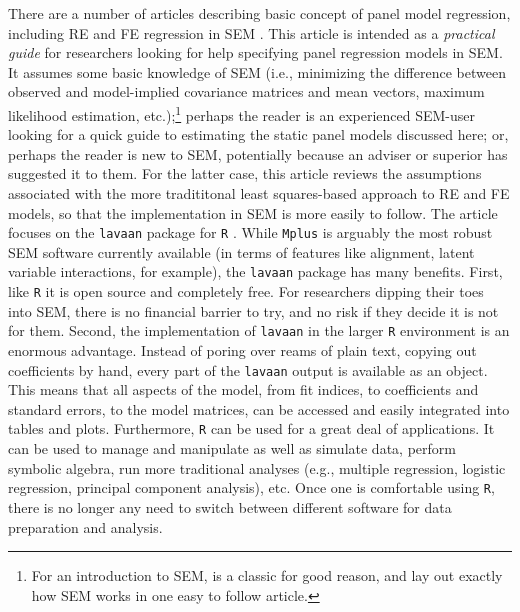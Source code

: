 \documentclass[]{interact}
\theoremstyle{plain}%
\theoremstyle{definition}
\theoremstyle{remark}
\begin{document}
There are a number of articles describing basic concept of panel model
regression, including RE and FE regression in SEM
\citep[e.g.,][]{Allison2011, Bollen2010, Teachman2001}. This article is
intended as a \textit{practical guide} for researchers looking for help
specifying panel regression models in SEM. It assumes some basic
knowledge of SEM (i.e., minimizing the difference between observed and
model-implied covariance matrices and mean vectors, maximum likelihood
estimation, etc.);\footnote{For an introduction to SEM,
  \citet{Bollen1989} is a classic for good reason, and
  \citet{Ferron2007} lay out exactly how SEM works in one easy to follow
  article.} perhaps the reader is an experienced SEM-user looking for a
quick guide to estimating the static panel models discussed here; or,
perhaps the reader is new to SEM, potentially because an adviser or
superior has suggested it to them. For the latter case, this article
reviews the assumptions associated with the more tradititonal least
squares-based approach to RE and FE models, so that the implementation
in SEM is more easily to follow. The article focuses on the
\texttt{lavaan} \citep{R-lavaan} package for \texttt{R} \citep{R-base}.
While \texttt{Mplus} \citep{Mplus} is arguably the most robust SEM
software currently available (in terms of features like alignment,
latent variable interactions, for example), the \texttt{lavaan} package
has many benefits. First, like \texttt{R} it is open source and
completely free. For researchers dipping their toes into SEM, there is
no financial barrier to try, and no risk if they decide it is not for
them. Second, the implementation of \texttt{lavaan} in the larger
\texttt{R} environment is an enormous advantage. Instead of poring over
reams of plain text, copying out coefficients by hand, every part of the
\texttt{lavaan} output is available as an object. This means that all
aspects of the model, from fit indices, to coefficients and standard
errors, to the model matrices, can be accessed and easily integrated
into tables and plots. Furthermore, \texttt{R} can be used for a great
deal of applications. It can be used to manage and manipulate as well as
simulate data, perform symbolic algebra, run more traditional analyses
(e.g., multiple regression, logistic regression, principal component
analysis), etc. Once one is comfortable using \texttt{R}, there is no
longer any need to switch between different software for data
preparation and analysis.
\end{document}
